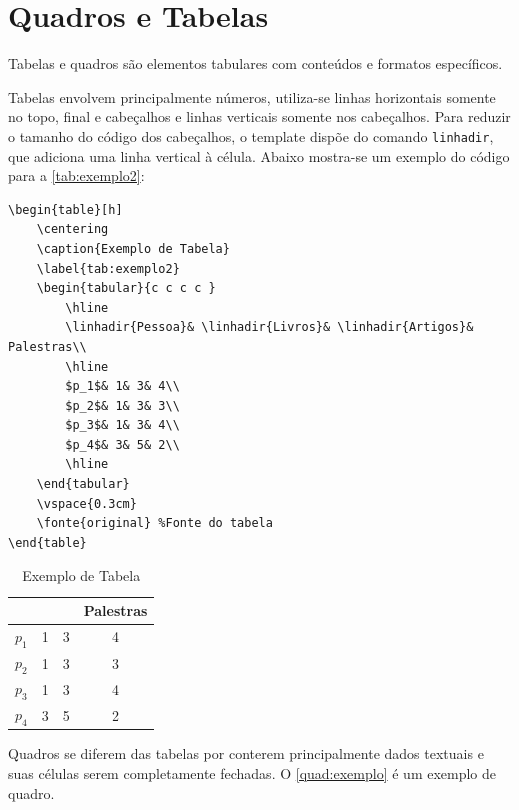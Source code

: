 \section{Quadros e Tabelas}

Tabelas e quadros são elementos tabulares com conteúdos e formatos específicos. 

Tabelas envolvem principalmente números, utiliza-se linhas horizontais somente no topo, final e cabeçalhos e linhas verticais somente nos cabeçalhos. Para reduzir o tamanho do código dos cabeçalhos, o template dispõe do comando \texttt{linhadir}, que adiciona uma linha vertical à célula. Abaixo mostra-se um exemplo do código para a \autoref{tab:exemplo2}:

\begin{lstlisting}[language={[LaTeX]Tex}]
\begin{table}[h]
	\centering
	\caption{Exemplo de Tabela} 
	\label{tab:exemplo2}
	\begin{tabular}{c c c c }
		\hline
		\linhadir{Pessoa}& \linhadir{Livros}& \linhadir{Artigos}& Palestras\\
		\hline
		$p_1$& 1& 3& 4\\
		$p_2$& 1& 3& 3\\
		$p_3$& 1& 3& 4\\
		$p_4$& 3& 5& 2\\
		\hline 
	\end{tabular}
	\vspace{0.3cm}
	\fonte{original} %Fonte do tabela
\end{table}
\end{lstlisting}

\begin{table}[h]
	\centering
	\caption{Exemplo de Tabela} 
	\label{tab:exemplo2}
	\begin{tabular}{c c c c }
		\hline
		\linhadir{\bf Pessoa} & \linhadir{\bf Livros} & \linhadir{\bf Artigos} & \bf Palestras \\
		\hline
		$p_1$ & 1 & 3 & 4 \\
		$p_2$ & 1 & 3 & 3 \\
		$p_3$ & 1 & 3 & 4 \\
		$p_4$ & 3 & 5 & 2 \\
		\hline 
	\end{tabular}
	\vspace{0.3cm}
\end{table}


Quadros se diferem das tabelas por conterem principalmente dados textuais e suas células serem completamente fechadas. O \autoref{quad:exemplo} é um exemplo de quadro.

